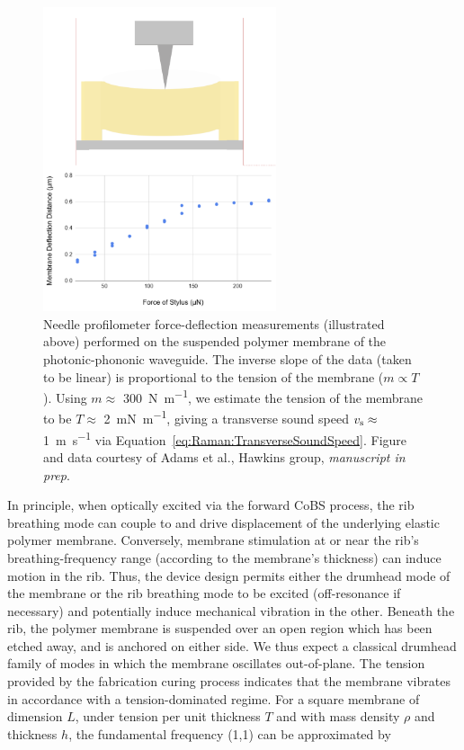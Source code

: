 \begin{figure}[t]
  \centering
  \includegraphics[width=0.61\textwidth]{figs/4-Raman/profilometer.png}
  \caption[Needle profilometer force-deflection measurements performed on the suspended polymer membrane of the photonic-phononic waveguide.]{Needle profilometer force-deflection measurements (illustrated above) performed on the suspended polymer membrane of the photonic-phononic waveguide. The inverse slope of the data (taken to be linear) is proportional to the tension of the membrane (\(m\propto T\)). Using \(m \approx\) \SI{300}{\newton\per\meter}, we estimate the tension of the membrane to be \(T \approx\) \SI{2}{\milli\newton\per\meter}, giving a transverse sound speed \(v_{\rm s} \approx\) \SI{1}{\meter\per\second} via Equation~\ref{eq:Raman:TransverseSoundSpeed}. Figure and data courtesy of Adams et al., Hawkins group, \textit{manuscript in prep}.}
  \label{fig:Raman:profilometer}
\end{figure}

In principle, when optically excited via the forward \ac{CoBS} process, the rib breathing mode can couple to and drive displacement of the underlying elastic polymer membrane. Conversely, membrane stimulation at or near the rib’s breathing-frequency range (according to the membrane's thickness) can induce motion in the rib. Thus, the device design permits either the drumhead mode of the membrane or the rib breathing mode to be excited (off-resonance if necessary) and potentially induce mechanical vibration in the other. Beneath the rib, the polymer membrane is suspended over an open region which has been etched away, and is anchored on either side. We thus expect a classical drumhead family of modes in which the membrane oscillates out-of-plane. The tension provided by the fabrication curing process indicates that the membrane vibrates in accordance with a tension-dominated regime. For a square membrane of dimension \(L\), under tension per unit thickness \(T\) and with mass density \(\rho\) and thickness \(h\), the fundamental frequency (1,1) can be approximated by \cite{strauss2007partial, blevins1980formulas, timoshenko1959theory}

